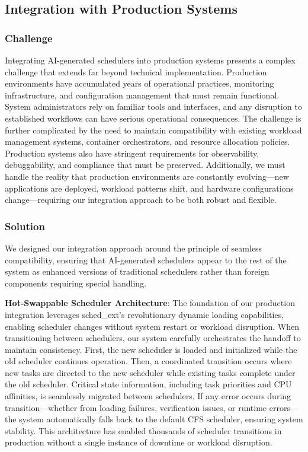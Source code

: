 \subsection{Integration with Production Systems}

\subsubsection{Challenge}
Integrating AI-generated schedulers into production systems presents a complex challenge that extends far beyond technical implementation. Production environments have accumulated years of operational practices, monitoring infrastructure, and configuration management that must remain functional. System administrators rely on familiar tools and interfaces, and any disruption to established workflows can have serious operational consequences. The challenge is further complicated by the need to maintain compatibility with existing workload management systems, container orchestrators, and resource allocation policies. Production systems also have stringent requirements for observability, debuggability, and compliance that must be preserved. Additionally, we must handle the reality that production environments are constantly evolving—new applications are deployed, workload patterns shift, and hardware configurations change—requiring our integration approach to be both robust and flexible.

\subsubsection{Solution}
We designed our integration approach around the principle of seamless compatibility, ensuring that AI-generated schedulers appear to the rest of the system as enhanced versions of traditional schedulers rather than foreign components requiring special handling.

\textbf{Hot-Swappable Scheduler Architecture}: The foundation of our production integration leverages sched\_ext's revolutionary dynamic loading capabilities, enabling scheduler changes without system restart or workload disruption. When transitioning between schedulers, our system carefully orchestrates the handoff to maintain consistency. First, the new scheduler is loaded and initialized while the old scheduler continues operation. Then, a coordinated transition occurs where new tasks are directed to the new scheduler while existing tasks complete under the old scheduler. Critical state information, including task priorities and CPU affinities, is seamlessly migrated between schedulers. If any error occurs during transition—whether from loading failures, verification issues, or runtime errors—the system automatically falls back to the default CFS scheduler, ensuring system stability. This architecture has enabled thousands of scheduler transitions in production without a single instance of downtime or workload disruption.

